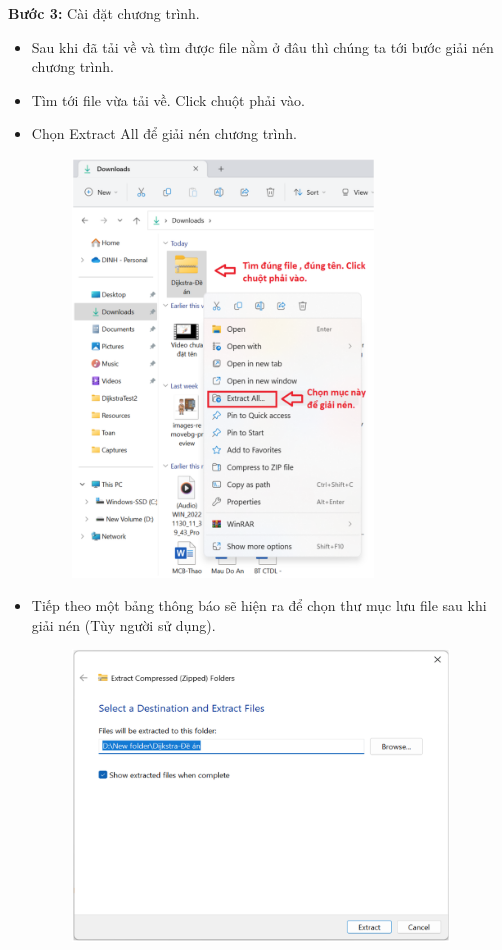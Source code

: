 \documentclass[a4paper]{article}
\begin{document}
\textbf{Bước 3:} Cài đặt chương trình.
\begin{itemize}
    \item Sau khi đã tải về và tìm được file nằm ở đâu thì chúng ta tới bước giải nén chương trình.
    \item Tìm tới file vừa tải về. Click chuột phải vào.
    \item Chọn Extract All để giải nén chương trình.
    
    \begin{figure}[!ht]
        \centering
        \includegraphics[width=8cm]{5.3.png}
    \end{figure}
    
    \item Tiếp theo một bảng thông báo sẽ hiện ra để chọn thư mục lưu file sau khi giải nén (Tùy người sử dụng).
    
    \begin{figure}[!ht]
        \centering
        \includegraphics[width=10cm]{5.4.png}
    \end{figure}
    

\end{itemize}
\end{document}
